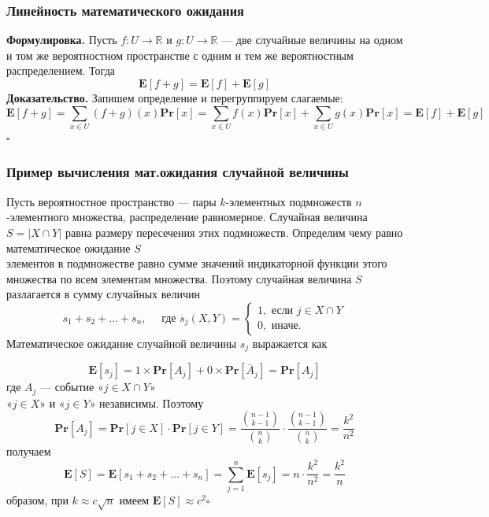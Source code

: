 \documentclass[a4paper]{article}
\newcommand{\qed}{\hfill$\square$}
\begin{document}
\subsubsection*{Линейность математического ожидания}
\textbf{Формулировка.} Пусть $f: U \rightarrow \mathbb{R}$ и $g: U \rightarrow \mathbb{R}$ — две случайные величины на одном и том же вероятностном пространстве с одним и тем же вероятностным распределением. Тогда $$\mathbf{E}[f+g]=\mathbf{E}[f]+\mathbf{E}[g]$$
\textbf{\indent Доказательство.} Запишем определение и перегруппируем слагаемые:
$$\mathbf{E}[f+g]=\sum_{x \in U}(f+g)(x) \textbf{Pr}[x]=\sum_{x \in U} f(x) \textbf{Pr}[x]+\sum_{x \in U} g(x) \textbf{Pr}[x]=\mathbf{E}[f]+\mathbf{E}[g]$$\qed

\subsubsection*{Пример вычисления мат.ожидания случайной величины}
Пусть вероятностное пространство — пары $k$-элементных подмножеств $n$-элементного множества, распределение равномерное. Случайная величина $S=|X \cap Y|$ равна размеру пересечения этих подмножеств. Определим чему равно математическое ожидание $S$\\[2mm]
 элементов в подмножестве равно сумме значений индикаторной функции этого множества по всем элементам множества. Поэтому случайная величина $S$ разлагается в сумму случайных величин
$$
s_{1}+s_{2}+\ldots+s_{n}, \quad \text { где } s_{j}(X, Y)=\left\{\begin{array}{l}
1, \text { если } j \in X \cap Y \\
0, \text { иначе. }
\end{array}\right.
$$
Математическое ожидание случайной величины $s_{j}$ выражается как

$$
\mathbf{E}\left[s_{j}\right]=1 \times \textbf{Pr}\left[A_{j}\right]+0 \times \textbf{Pr}\left[\bar{A}_{j}\right]=\textbf{Pr}\left[A_{j}\right]
$$
где $A_{j}$ — событие «$j \in X \cap Y$»\\
 «$j\in X$» и «$j \in Y$» независимы. Поэтому
$$
\textbf{Pr}\left[A_{j}\right]=\textbf{Pr}[j \in X] \cdot \textbf{Pr}[j \in Y]=\displaystyle\frac{\binom{n-1}{k-1}}{\binom{n}{k}}\cdot\displaystyle\frac{\binom{n-1}{k-1}}{\binom{n}{k}}=\frac{k^{2}}{n^{2}}$$
 получаем
$$
\mathbf{E}[S]=\mathbf{E}\left[s_{1}+s_{2}+\ldots+s_{n}\right]=\sum_{j=1}^{n} \mathbf{E}\left[s_{j}\right]=n \cdot \frac{k^{2}}{n^{2}}=\frac{k^{2}}{n}
$$
 образом, при $k \approx c \sqrt{n}$ имеем $\mathbf{E}[S] \approx c^{2}$\qed
\label{2.38}
\end{document}
